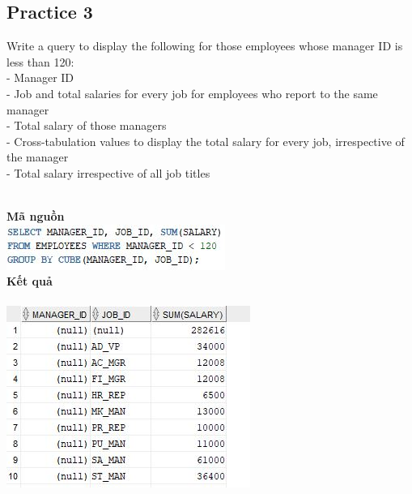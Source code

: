 \documentclass[12pt,a4paper]{report}
\begin{document}
\subsection{Practice 3}
\begin{boxedminipage}[t]{15.5cm}
	Write a query to display the following for those employees whose manager ID is less than 120:\\
	- Manager ID\\
	- Job and total salaries for every job for employees who report to the same manager\\
	- Total salary of those managers\\
	- Cross-tabulation values to display the total salary for every job, irrespective of the manager \\
	- Total salary irrespective of all job titles
	
	
\end{boxedminipage}
\newline
\\
\textbf{Mã nguồn}
\\
\newline
\includegraphics[scale=1]{38.jpg}\\
\textbf{Kết quả}\\\\
\includegraphics[scale=1]{k38.jpg}
\end{document}
